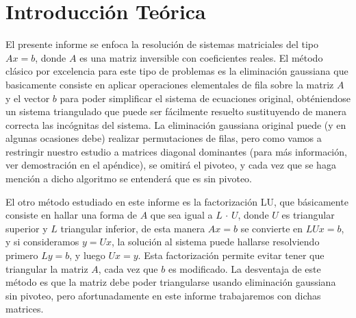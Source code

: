 \section{Introducción Teórica}
%
El presente informe se enfoca la resolución de sistemas matriciales del tipo $Ax=b$, donde $A$ es una matriz inversible con coeficientes reales. El método clásico por excelencia para este tipo de problemas es la eliminación gaussiana que basicamente consiste en aplicar operaciones elementales de fila sobre la matriz $A$ y el vector $b$ para poder simplificar el sistema de ecuaciones original, obténiendose un sistema triangulado que puede ser fácilmente resuelto sustituyendo de manera correcta las incógnitas del sistema. La eliminación gaussiana original puede (y en algunas ocasiones debe) realizar permutaciones de filas, pero como vamos a restringir nuestro estudio a matrices diagonal dominantes (para más información, ver demostración en el apéndice), se omitirá el pivoteo, y cada vez que se haga mención a dicho algoritmo se entenderá que es sin pivoteo.

El otro método estudiado en este informe es la factorización LU, que básicamente consiste en hallar una forma de $A$ que sea igual a $L$ $\cdot$ $U$, donde $U$ es triangular superior y $L$ triangular inferior, de esta manera $Ax=b$ se convierte en $LUx=b$, y si consideramos $y=Ux$, la solución al sistema puede hallarse resolviendo primero $Ly=b$, y luego $Ux=y$. Esta factorización permite evitar tener que triangular la matriz $A$, cada vez que $b$ es modificado. La desventaja de este método es que la matriz debe poder triangularse usando eliminación gaussiana sin pivoteo, pero afortunadamente en este informe trabajaremos con dichas matrices.
